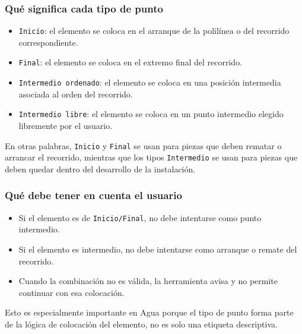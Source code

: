 
\subsubsection{Qué significa cada tipo de punto}

\begin{itemize}
\item \texttt{Inicio}: el elemento se coloca en el arranque de la polilínea o del recorrido correspondiente.
\item \texttt{Final}: el elemento se coloca en el extremo final del recorrido.
\item \texttt{Intermedio ordenado}: el elemento se coloca en una posición intermedia asociada al orden del recorrido.
\item \texttt{Intermedio libre}: el elemento se coloca en un punto intermedio elegido libremente por el usuario.
\end{itemize}

En otras palabras, \texttt{Inicio} y \texttt{Final} se usan para piezas que deben rematar o arrancar el recorrido, mientras que los tipos \texttt{Intermedio} se usan para piezas que deben quedar dentro del desarrollo de la instalación.

\subsubsection{Qué debe tener en cuenta el usuario}

\begin{itemize}
\item Si el elemento es de \texttt{Inicio/Final}, no debe intentarse como punto intermedio.
\item Si el elemento es intermedio, no debe intentarse como arranque o remate del recorrido.
\item Cuando la combinación no es válida, la herramienta avisa y no permite continuar con esa colocación.
\end{itemize}

Esto es especialmente importante en Agua porque el tipo de punto forma parte de la lógica de colocación del elemento, no es solo una etiqueta descriptiva.

